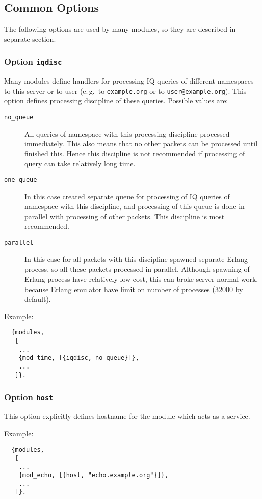 \documentclass[a4paper,10pt]{article}
\newcommand{\bracehack}{\def\{{\char"7B}\def\}{\char"7D}}
\newcommand{\jid}[1]{\texttt{#1}}
\newcommand{\option}[1]{\texttt{#1}}
\newcommand{\titem}[1]{\item[\bracehack\texttt{#1}]}
\begin{document}
\subsection{Common Options}
\label{sec:modcommonopts}

The following options are used by many modules, so they are described in
separate section.

\subsubsection{Option \option{iqdisc}}
\label{sec:modiqdiscoption}

Many modules define handlers for processing IQ queries of different namespaces
to this server or to user (e.\,g.\ to \jid{example.org} or to
\jid{user@example.org}).  This option defines processing discipline of
these queries.  Possible values are:
\begin{description}
\titem{no\_queue} All queries of namespace with this processing
  discipline processed immediately.  This also means that no other packets can
  be processed until finished this.  Hence this discipline is not recommended
  if processing of query can take relatively long time.
\titem{one\_queue} In this case created separate queue for processing
  of IQ queries of namespace with this discipline, and processing of this queue
  is done in parallel with processing of other packets. This discipline is most
  recommended.
\titem{parallel} In this case for all packets with this discipline
  spawned separate Erlang process, so all these packets processed in parallel.
  Although spawning of Erlang process have relatively low cost, this can broke
  server normal work, because Erlang emulator have limit on number of processes
  (32000 by default).
\end{description}

Example:
\begin{verbatim}
  {modules,
   [
    ...
    {mod_time, [{iqdisc, no_queue}]},
    ...
   ]}.
\end{verbatim}

\subsubsection{Option \option{host}}
\label{sec:modhostoption}

This option explicitly defines hostname for the module which acts as a service.

Example:
\begin{verbatim}
  {modules,
   [
    ...
    {mod_echo, [{host, "echo.example.org"}]},
    ...
   ]}.
\end{verbatim}
\end{document}
